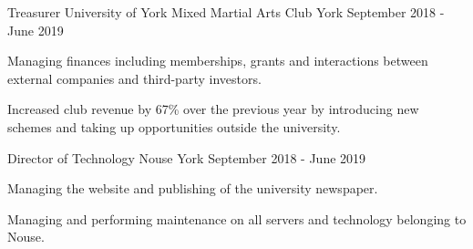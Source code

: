 
\begin{cventries}
  \cventry
    {Treasurer} %
    {University of York Mixed Martial Arts Club} %
    {York} %
    {September 2018 - June 2019} %
    {
      \begin{cvitems} %
         \item {Managing finances including memberships, grants and interactions between external companies and third-party investors.}
         \vspace{0.5mm}
         \item {Increased club revenue by 67\% over the previous year by introducing new schemes and taking up opportunities outside the university.}
      \end{cvitems}
    }

  \cventry
    {Director of Technology} %
    {Nouse} %
    {York} %
    {September 2018 - June 2019} %
    {
      \begin{cvitems} %
         \item {Managing the website and publishing of the university newspaper.}
         \vspace{0.5mm}
         \item {Managing and performing maintenance on all servers and technology belonging to Nouse.}
      \end{cvitems}
    }

\end{cventries}
